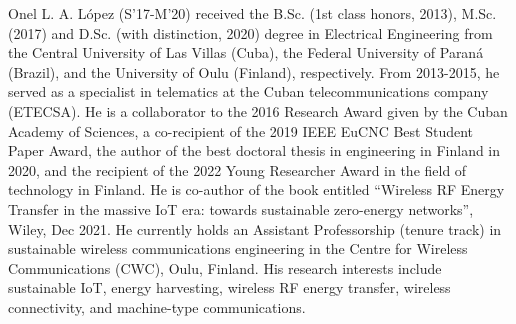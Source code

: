 \documentclass[lettersize,journal]{IEEEtran}
\begin{document}
 \begin{IEEEbiography}
 { Onel L. A. López} (S'17-M'20) received the B.Sc. (1st class honors, 2013), M.Sc. (2017) and D.Sc. (with distinction, 2020) degree in Electrical Engineering from the Central University of Las Villas (Cuba),  the Federal University of Paraná (Brazil), and the University of Oulu (Finland), respectively. From 2013-2015, he served as a specialist in telematics at the Cuban telecommunications company (ETECSA). He is a collaborator to the 2016 Research Award given by the Cuban Academy of Sciences, a co-recipient of the 2019 IEEE EuCNC Best Student Paper Award, the author of the best doctoral thesis in engineering in Finland in 2020, and the recipient of the 2022 Young Researcher Award in the field of technology in Finland. He is co-author of the book entitled ``Wireless RF Energy Transfer in the massive IoT era: towards sustainable zero-energy networks'', Wiley, Dec 2021. He currently holds an Assistant Professorship (tenure track) in sustainable wireless communications engineering in the Centre for Wireless Communications (CWC), Oulu, Finland. His research interests include sustainable IoT, energy harvesting, wireless RF energy transfer, wireless connectivity, and machine-type communications.
 \end{IEEEbiography}
\end{document}
